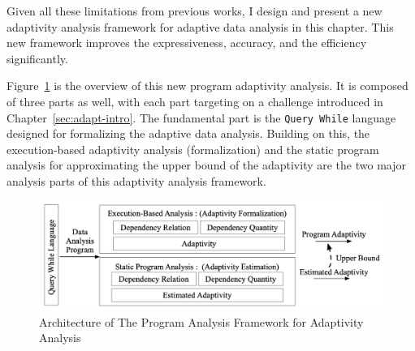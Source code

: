 
Given all these limitations from previous works, I design and present a new adaptivity analysis framework for
adaptive data analysis in this chapter.
This new framework improves the expressiveness, accuracy, and the efficiency significantly.

Figure~\ref{fig:structure} is the overview of this new program adaptivity analysis.
It is composed of three parts as well, with each part targeting on a challenge introduced in Chapter~\ref{sec:adapt-intro}.
The fundamental part is the {\tt Query While} language designed for formalizing the 
adaptive data analysis. Building on this, 
the execution-based adaptivity analysis (formalization)
and the static program analysis for approximating the upper bound of the 
adaptivity are the two major analysis parts of this adaptivity analysis framework.
\begin{figure}
   \centering   
   \includegraphics[width=1.0\textwidth]{figures/overview.png}
  \caption{Architecture of The Program Analysis Framework for Adaptivity Analysis}
   \label{fig:structure}
\end{figure}